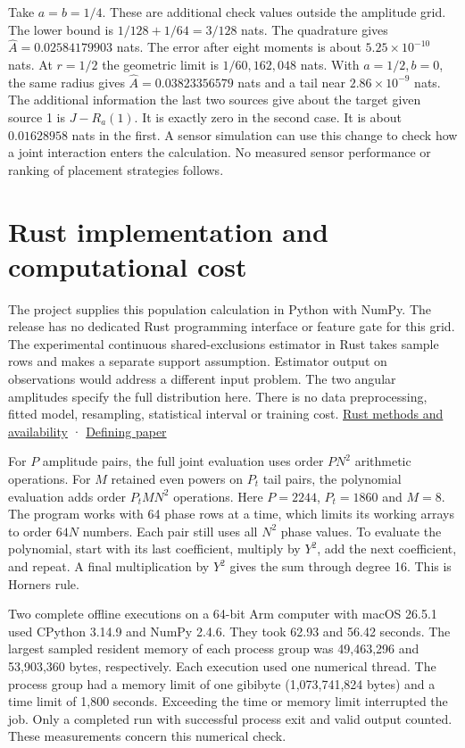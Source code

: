 Take \(a=b=1/4\). These are additional check values outside the amplitude grid. The lower bound is \(1/128+1/64=3/128\) nats. The quadrature gives \(\widehat A=0.02584179903\) nats. The error after eight moments is about \(5.25\times10^{-10}\) nats. At \(r=1/2\) the geometric limit is \(1/60{,}162{,}048\) nats. With \(a=1/2,b=0\), the same radius gives \(\widehat A=0.03823356579\) nats and a tail near \(2.86\times10^{-9}\) nats. The additional information the last two sources give about the target given source 1 is \(J-R_a(1)\). It is exactly zero in the second case. It is about \(0.01628958\) nats in the first. A sensor simulation can use this change to check how a joint interaction enters the calculation. No measured sensor performance or ranking of placement strategies follows.

\clearpage

\section{Rust implementation and computational cost}\label{rust-implementation-and-computational-cost}

The project supplies this population calculation in Python with NumPy. The release has no dedicated Rust programming interface or feature gate for this grid. The experimental continuous shared-exclusions estimator in Rust takes sample rows and makes a separate support assumption. Estimator output on observations would address a different input problem. The two angular amplitudes specify the full distribution here. There is no data preprocessing, fitted model, resampling, statistical interval or training cost. \href{https://github.com/sepahead/pid-rs/blob/main/METHODS.md}{Rust methods and availability} · \href{https://doi.org/10.1103/PhysRevE.110.014115}{Defining paper}

For \(P\) amplitude pairs, the full joint evaluation uses order \(PN^2\) arithmetic operations. For \(M\) retained even powers on \(P_t\) tail pairs, the polynomial evaluation adds order \(P_t M N^2\) operations. Here \(P=2244\), \(P_t=1860\) and \(M=8\). The program works with 64 phase rows at a time, which limits its working arrays to order \(64N\) numbers. Each pair still uses all \(N^2\) phase values. To evaluate the polynomial, start with its last coefficient, multiply by \(Y^2\), add the next coefficient, and repeat. A final multiplication by \(Y^2\) gives the sum through degree 16. This is Horner\textquotesingle s rule.

Two complete offline executions on a 64-bit Arm computer with macOS 26.5.1 used CPython 3.14.9 and NumPy 2.4.6. They took 62.93 and 56.42 seconds. The largest sampled resident memory of each process group was 49,463,296 and 53,903,360 bytes, respectively. Each execution used one numerical thread. The process group had a memory limit of one gibibyte (1,073,741,824 bytes) and a time limit of 1,800 seconds. Exceeding the time or memory limit interrupted the job. Only a completed run with successful process exit and valid output counted. These measurements concern this numerical check.

